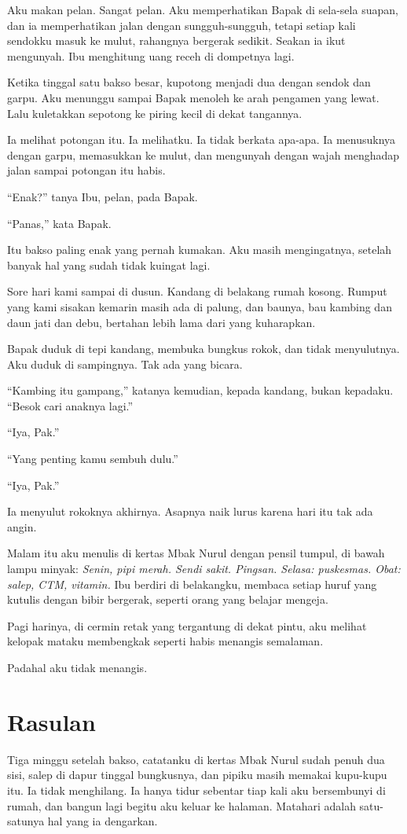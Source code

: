 \documentclass[11pt,twoside,openany]{book}
\makeatletter
\newcommand{\scenebreak}{\par\vspace{0.9em}{\centering\textsc{*\hspace{0.7em}*\hspace{0.7em}*}\par}\vspace{0.9em}\@afterindentfalse\@afterheading}
\makeatother
\begin{document}
Aku makan pelan. Sangat pelan. Aku memperhatikan Bapak di sela-sela suapan, dan ia memperhatikan jalan dengan sungguh-sungguh, tetapi setiap kali sendokku masuk ke mulut, rahangnya bergerak sedikit. Seakan ia ikut mengunyah. Ibu menghitung uang receh di dompetnya lagi.

Ketika tinggal satu bakso besar, kupotong menjadi dua dengan sendok dan garpu. Aku menunggu sampai Bapak menoleh ke arah pengamen yang lewat. Lalu kuletakkan sepotong ke piring kecil di dekat tangannya.

Ia melihat potongan itu. Ia melihatku. Ia tidak berkata apa-apa. Ia menusuknya dengan garpu, memasukkan ke mulut, dan mengunyah dengan wajah menghadap jalan sampai potongan itu habis.

``Enak?'' tanya Ibu, pelan, pada Bapak.

``Panas,'' kata Bapak.

Itu bakso paling enak yang pernah kumakan. Aku masih mengingatnya, setelah banyak hal yang sudah tidak kuingat lagi.

\scenebreak
Sore hari kami sampai di dusun. Kandang di belakang rumah kosong. Rumput yang kami sisakan kemarin masih ada di palung, dan baunya, bau kambing dan daun jati dan debu, bertahan lebih lama dari yang kuharapkan.

Bapak duduk di tepi kandang, membuka bungkus rokok, dan tidak menyulutnya. Aku duduk di sampingnya. Tak ada yang bicara.

``Kambing itu gampang,'' katanya kemudian, kepada kandang, bukan kepadaku. ``Besok cari anaknya lagi.''

``Iya, Pak.''

``Yang penting kamu sembuh dulu.''

``Iya, Pak.''

Ia menyulut rokoknya akhirnya. Asapnya naik lurus karena hari itu tak ada angin.

Malam itu aku menulis di kertas Mbak Nurul dengan pensil tumpul, di bawah lampu minyak: \emph{Senin, pipi merah. Sendi sakit. Pingsan. Selasa: puskesmas. Obat: salep, CTM, vitamin.} Ibu berdiri di belakangku, membaca setiap huruf yang kutulis dengan bibir bergerak, seperti orang yang belajar mengeja.

Pagi harinya, di cermin retak yang tergantung di dekat pintu, aku melihat kelopak mataku membengkak seperti habis menangis semalaman.

Padahal aku tidak menangis.

\chapter{Rasulan}
Tiga minggu setelah bakso, catatanku di kertas Mbak Nurul sudah penuh dua sisi, salep di dapur tinggal bungkusnya, dan pipiku masih memakai kupu-kupu itu. Ia tidak menghilang. Ia hanya tidur sebentar tiap kali aku bersembunyi di rumah, dan bangun lagi begitu aku keluar ke halaman. Matahari adalah satu-satunya hal yang ia dengarkan.
\end{document}
